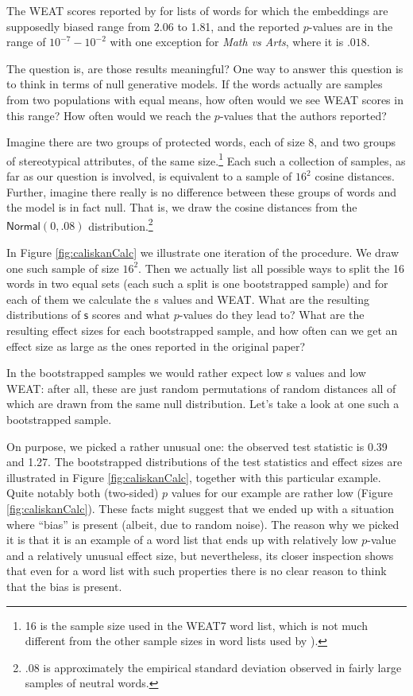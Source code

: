 \documentclass{clv3}
\begin{document}
\normalsize

\noindent The \textsf{WEAT} scores reported by \citep{Caliskan2017semanticsBiases} for lists of
words for which the embeddings are supposedly biased range from 2.06 to
1.81, and the reported \(p\)-values are in the range of
\(10^{-7}-10^{-2}\) with one exception for \emph{Math vs Arts}, where it
is \(.018\).

The question is, are those results meaningful? One way to answer this
question is to think in terms of null generative models. If the words
actually are samples from two populations with equal means, how often
would we see \textsf{WEAT} scores in this range? How often would we
reach the \(p\)-values that the authors reported?

Imagine there are two groups of protected words, each of size 8, and two
groups of stereotypical attributes, of the same size.\footnote{16 is the
  sample size used in the WEAT7 word list, which is not much different
  from the other sample sizes in word lists used by \citep{Caliskan2017semanticsBiases}).} Each such
a collection of samples, as far as our question is involved, is
equivalent to a sample of \(16^2\) cosine distances. Further, imagine
there really is no difference between these groups of words and the model
is in fact null. That is, we draw the cosine distances from the
\(\mathsf{Normal}(0,.08)\) distribution.\footnote{\(.08\) is
  approximately the empirical standard deviation observed in fairly
  large samples of neutral words.}

In Figure \ref{fig:caliskanCalc} we illustrate one iteration of the
procedure. We draw one such sample of size \(16^2\). Then we actually
list all possible ways to split the 16 words in two equal sets (each
such a split is one bootstrapped sample) and for each of them we
calculate the \textsf{s} values and \textsf{WEAT}. What are the
resulting distributions of \(\textsf{s}\) scores and what \(p\)-values
do they lead to? What are the resulting effect sizes for each
bootstrapped sample, and how often can we get an effect size as large as
the ones reported in the original paper?

In the bootstrapped samples we would rather expect low \textsf{s} values
and low \textsf{WEAT}: after all, these are just random permutations of
random distances all of which are drawn from the same null distribution.
Let's take a look at one such a bootstrapped sample.

On purpose, we picked a rather unusual one: the observed test statistic
is 0.39 and 1.27. The bootstrapped distributions of the test statistics
and effect sizes are illustrated in Figure \ref{fig:caliskanCalc},
together with this particular example. Quite notably both (two-sided)
\(p\) values for our example are rather low (Figure
\ref{fig:caliskanCalc}). These facts might suggest that we ended up
with a situation where ``bias'' is present (albeit, due to random
noise). The reason why we picked it is that it is an example of a word
list that ends up with relatively low \(p\)-value and a relatively
unusual effect size, but nevertheless, its closer inspection shows that
even for a word list with such properties there is no clear reason to
think that the bias is present.
\end{document}

